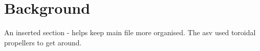 \section{Background}
An inserted section - helps keep main file more organised.
The \acrfull{asv} used \glspl{toroidal propeller} to get around.
